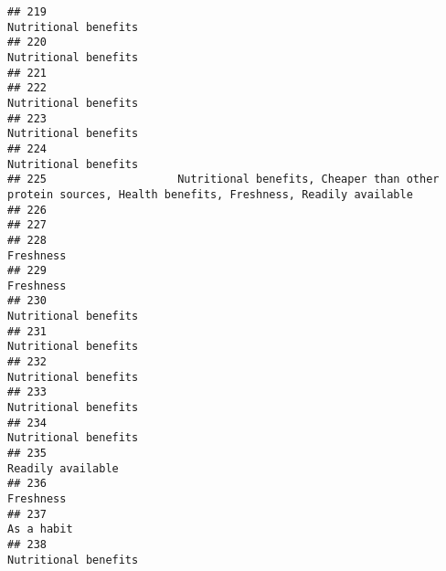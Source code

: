 \documentclass[
]{article}
\begin{document}
\begin{verbatim}
## 219                                                                                                       Nutritional benefits
## 220                                                                                                       Nutritional benefits
## 221                                                                                                                           
## 222                                                                                                       Nutritional benefits
## 223                                                                                                       Nutritional benefits
## 224                                                                                                       Nutritional benefits
## 225                    Nutritional benefits, Cheaper than other protein sources, Health benefits, Freshness, Readily available
## 226                                                                                                                           
## 227                                                                                                                           
## 228                                                                                                                  Freshness
## 229                                                                                                                  Freshness
## 230                                                                                                       Nutritional benefits
## 231                                                                                                       Nutritional benefits
## 232                                                                                                       Nutritional benefits
## 233                                                                                                       Nutritional benefits
## 234                                                                                                       Nutritional benefits
## 235                                                                                                          Readily available
## 236                                                                                                                  Freshness
## 237                                                                                                                 As a habit
## 238                                                                                                       Nutritional benefits

\end{verbatim}
\end{document}
